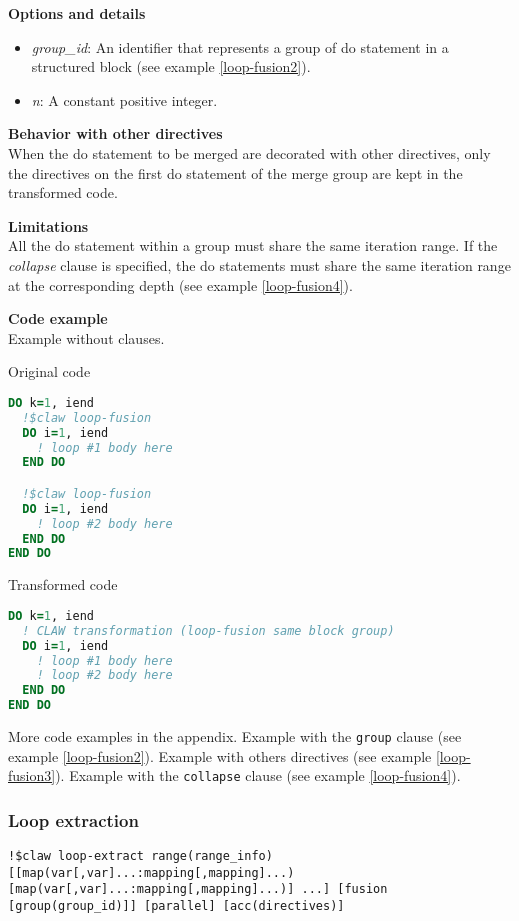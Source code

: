 \textbf{Options and details}
\begin{itemize}
\item \textit{group\_id}: An identifier that represents a group of do statement
in a structured block (see example \ref{loop-fusion2}).
\item \textit{n}: A constant positive integer.
\end{itemize}

\textbf{Behavior with other directives}\\
When the do statement to be merged are decorated with other directives, only the
directives on the first do statement of the merge group are kept in the
transformed code.

\textbf{Limitations}\\
All the do statement within a group must share the same iteration range. If the
\textit{collapse} clause is specified, the do statements must share the same
iteration range at the corresponding depth (see example \ref{loop-fusion4}).

\textbf{Code example}\\
\label{loop-fusion-1}
Example without clauses.

Original code
\begin{lstlisting}[language=Fortran]
DO k=1, iend
  !$claw loop-fusion
  DO i=1, iend
    ! loop #1 body here
  END DO

  !$claw loop-fusion
  DO i=1, iend
    ! loop #2 body here
  END DO
END DO
\end{lstlisting}

Transformed code
\begin{lstlisting}[language=Fortran]
DO k=1, iend
  ! CLAW transformation (loop-fusion same block group)
  DO i=1, iend
    ! loop #1 body here
    ! loop #2 body here
  END DO
END DO
\end{lstlisting}

More code examples in the appendix. Example with the \lstinline!group! clause
(see example \ref{loop-fusion2}). Example with others directives (see example
\ref{loop-fusion3}). Example with the \lstinline!collapse! clause (see example
\ref{loop-fusion4}).

%
%
\subsubsection{Loop extraction}
\begin{lstlisting}
!$claw loop-extract range(range_info) [[map(var[,var]...:mapping[,mapping]...) [map(var[,var]...:mapping[,mapping]...)] ...] [fusion [group(group_id)]] [parallel] [acc(directives)]
\end{lstlisting}

